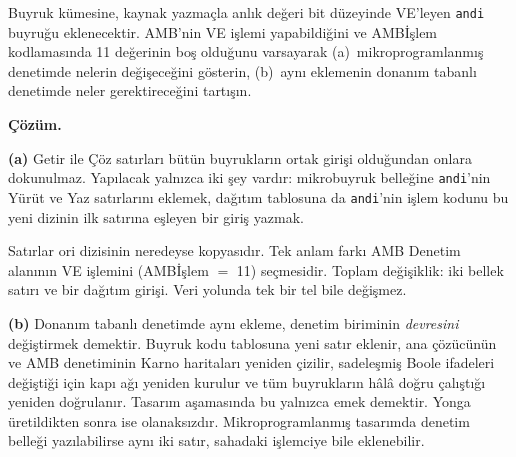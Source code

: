 \begin{ornek}
Buyruk kümesine, kaynak yazmaçla anlık değeri bit düzeyinde VE'leyen \texttt{andi} buyruğu eklenecektir. AMB'nin VE işlemi yapabildiğini ve AMBİşlem kodlamasında 11 değerinin boş olduğunu varsayarak (a)~mikroprogramlanmış denetimde nelerin değişeceğini gösterin, (b)~aynı eklemenin donanım tabanlı denetimde neler gerektireceğini tartışın.

\tcblower
\textbf{Çözüm.}

\textbf{(a)} Getir ile Çöz satırları bütün buyrukların ortak girişi olduğundan onlara dokunulmaz. Yapılacak yalnızca iki şey vardır: mikrobuyruk belleğine \texttt{andi}'nin Yürüt ve Yaz satırlarını eklemek, dağıtım tablosuna da \texttt{andi}'nin işlem kodunu bu yeni dizinin ilk satırına eşleyen bir giriş yazmak.

\begin{center}
\footnotesize
{}
\end{center}

Satırlar ori dizisinin neredeyse kopyasıdır. Tek anlam farkı AMB Denetim alanının VE işlemini (AMBİşlem $=$ 11) seçmesidir. Toplam değişiklik: iki bellek satırı ve bir dağıtım girişi. Veri yolunda tek bir tel bile değişmez.

\textbf{(b)} Donanım tabanlı denetimde aynı ekleme, denetim biriminin \emph{devresini} değiştirmek demektir. Buyruk kodu tablosuna yeni satır eklenir, ana çözücünün ve AMB denetiminin Karno haritaları yeniden çizilir, sadeleşmiş Boole ifadeleri değiştiği için kapı ağı yeniden kurulur ve tüm buyrukların hâlâ doğru çalıştığı yeniden doğrulanır. Tasarım aşamasında bu yalnızca emek demektir. Yonga üretildikten sonra ise olanaksızdır. Mikroprogramlanmış tasarımda denetim belleği yazılabilirse aynı iki satır, sahadaki işlemciye bile eklenebilir.
\end{ornek}

